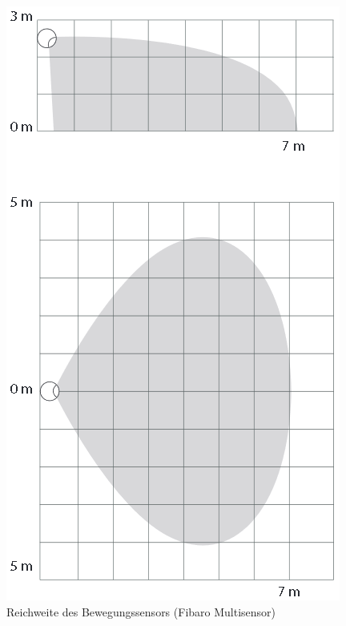 \begin{figure}[h!]
	\centering
	\includegraphics[scale=0.4]{img/Sensorevaluation/FibaroMultiRange.png}
	\caption{Reichweite des Bewegungssensors (Fibaro Multisensor)}
	\label{fig:sensorenFibaroMultiRange}
\end{figure}
 
